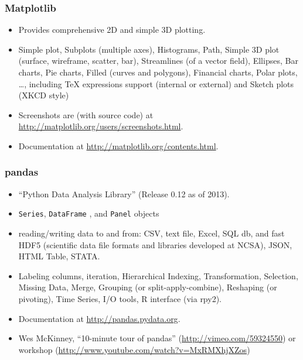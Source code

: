 \documentclass{beamer}
\begin{document}
\begin{frame}[fragile]
\frametitle{Matplotlib}
\begin{itemize}
\item Provides comprehensive 2D and simple 3D plotting.
\item Simple plot, Subplots (multiple axes),
      Histograms, Path, Simple 3D plot (surface, wireframe, scatter, bar),
      Streamlines (of a vector field), Ellipses,
      Bar charts, Pie charts, Filled (curves and polygons),
      Financial charts, Polar plots, \ldots, including TeX expressions support
      (internal or external) and Sketch plots (XKCD style)
\item Screenshots are (with source code) at 
      \url{http://matplotlib.org/users/screenshots.html}.
\item Documentation at \url{http://matplotlib.org/contents.html}.
\end{itemize}
\end{frame}

\begin{frame}[fragile]
\frametitle{pandas}
\begin{itemize}
\item ``Python Data Analysis Library'' (Release 0.12 as of 2013).
\item \lstinline{Series}, \lstinline{DataFrame}
      , and \lstinline{Panel} objects
\item reading/writing data to and from: CSV,
      text file, Excel, SQL db, and fast HDF5 
      (scientific data file formats and libraries
       developed at NCSA), JSON, HTML Table, STATA.
\item Labeling columns, iteration, 
      Hierarchical Indexing, Transformation,
      Selection, Missing Data, Merge,
      Grouping (or split-apply-combine),
      Reshaping (or pivoting), Time Series,
      I/O tools, R interface (via rpy2).
\item Documentation at \url{http://pandas.pydata.org}.
\item Wes McKinney, ``10-minute tour of pandas''
      (\url{http://vimeo.com/59324550}) or workshop
      (\url{http://www.youtube.com/watch?v=MxRMXhjXZos})      
\end{itemize}
\end{frame}

\end{document}
